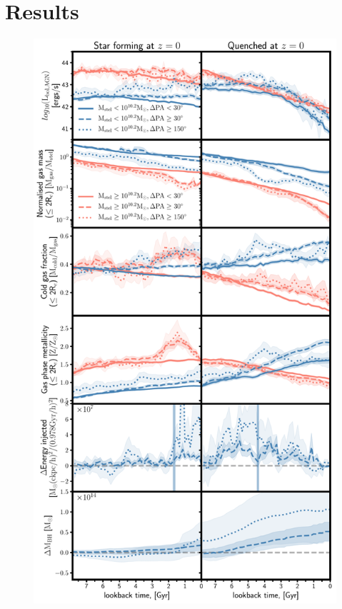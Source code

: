 \documentclass[fleqn,usenatbib]{mnras}
\begin{document}
\section{Results} \label{sec:results}
\begin{figure}
	\includegraphics[width=0.97\linewidth]{overall_population/time_evo_letter.pdf}

\end{figure}
\end{document}
